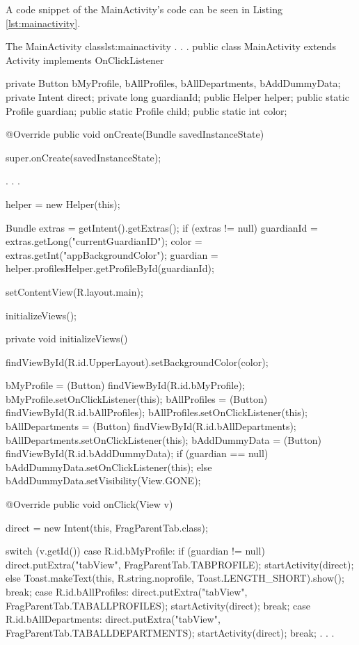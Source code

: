A code snippet of the MainActivity's code can be seen in Listing \vref{lst:mainactivity}.

\begin{Java}{The MainActivity class}{lst:mainactivity}
.
.
.
public class MainActivity extends Activity implements OnClickListener {

	private Button bMyProfile, bAllProfiles, bAllDepartments, bAddDummyData;
	private Intent direct;
	private long guardianId;
	public Helper helper;
	public static Profile guardian;
	public static Profile child;
	public static int color;

	@Override
	public void onCreate(Bundle savedInstanceState){
		super.onCreate(savedInstanceState);

		.
		.
		.

		helper = new Helper(this);

		Bundle extras = getIntent().getExtras();
		if (extras != null) {        	   
			guardianId = extras.getLong("currentGuardianID");
			color = extras.getInt("appBackgroundColor");
			guardian = helper.profilesHelper.getProfileById(guardianId);
		}

		setContentView(R.layout.main);
		
		initializeViews();
	}

	private void initializeViews() {
		findViewById(R.id.UpperLayout).setBackgroundColor(color);
		
		bMyProfile = (Button) findViewById(R.id.bMyProfile);
		bMyProfile.setOnClickListener(this);
		bAllProfiles = (Button) findViewById(R.id.bAllProfiles);
		bAllProfiles.setOnClickListener(this);
		bAllDepartments = (Button) findViewById(R.id.bAllDepartments);
		bAllDepartments.setOnClickListener(this);
		bAddDummyData = (Button) findViewById(R.id.bAddDummyData);
		if (guardian == null) {
			bAddDummyData.setOnClickListener(this);
		} else {
			bAddDummyData.setVisibility(View.GONE);
		}
	}

	@Override
	public void onClick(View v) {
		direct = new Intent(this, FragParentTab.class);

		switch (v.getId()) {
		case R.id.bMyProfile:
			if (guardian != null) {
				direct.putExtra("tabView", FragParentTab.TABPROFILE);
				startActivity(direct);
			} else {
				Toast.makeText(this, R.string.noprofile, Toast.LENGTH_SHORT).show();
			}
			break;
		case R.id.bAllProfiles:
			direct.putExtra("tabView", FragParentTab.TABALLPROFILES);
			startActivity(direct);
			break;
		case R.id.bAllDepartments:
			direct.putExtra("tabView", FragParentTab.TABALLDEPARTMENTS);
			startActivity(direct);
			break;
		.
		.
		.
		}
	}
}
\end{Java}


